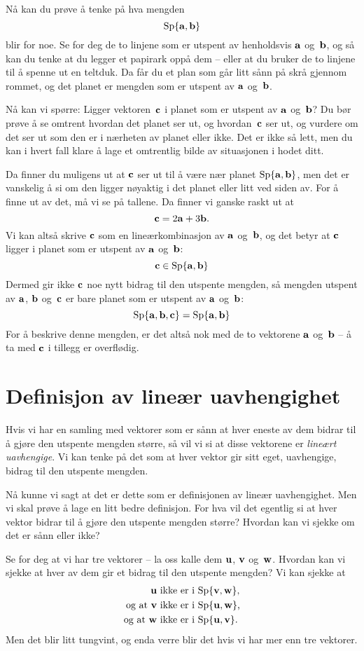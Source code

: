 Nå kan du prøve å tenke på hva mengden
\[
\operatorname{Sp} \{ \mathbf{a}, \mathbf{b} \}
\]
blir for noe.  Se for deg de to linjene som er utspent av henholdsvis
$\mathbf{a}$ og~$\mathbf{b}$, og så kan du tenke at du legger et papirark oppå dem --
eller at du bruker de to linjene til å spenne ut en teltduk.  Da får
du et plan som går litt sånn på skrå gjennom rommet, og det planet er
mengden som er utspent av $\mathbf{a}$ og~$\mathbf{b}$.

Nå kan vi spørre: Ligger vektoren~$\mathbf{c}$ i planet som er utspent av $\mathbf{a}$
og~$\mathbf{b}$?  Du bør prøve å se omtrent hvordan det planet ser ut, og
hvordan~$\mathbf{c}$ ser ut, og vurdere om det ser ut som den er i nærheten av
planet eller ikke.  Det er ikke så lett, men du kan i hvert fall klare
å lage et omtrentlig bilde av situasjonen i hodet ditt.

Da finner du muligens ut at $\mathbf{c}$ ser ut til å være nær planet
$\operatorname{Sp}\{ \mathbf{a}, \mathbf{b} \}$, men det er vanskelig å si om den ligger nøyaktig i
det planet eller litt ved siden av.  For å finne ut av det, må vi se
på tallene.  Da finner vi ganske raskt ut at
\[
\mathbf{c} = 2\mathbf{a} + 3\mathbf{b}.
\]
Vi kan altså skrive $\mathbf{c}$ som en lineærkombinasjon av $\mathbf{a}$ og~$\mathbf{b}$, og
det betyr at $\mathbf{c}$ ligger i planet som er utspent av $\mathbf{a}$ og~$\mathbf{b}$:
\[
\mathbf{c} \in \operatorname{Sp} \{ \mathbf{a}, \mathbf{b} \}
\]
Dermed gir ikke $\mathbf{c}$ noe nytt bidrag til den utspente mengden, så
mengden utspent av $\mathbf{a}$, $\mathbf{b}$ og~$\mathbf{c}$ er bare planet som er utspent av
$\mathbf{a}$ og~$\mathbf{b}$:
\[
\operatorname{Sp} \{ \mathbf{a}, \mathbf{b}, \mathbf{c} \} = \operatorname{Sp} \{ \mathbf{a}, \mathbf{b} \}
\]
For å beskrive denne mengden, er det altså nok med de to vektorene
$\mathbf{a}$ og~$\mathbf{b}$ -- å ta med $\mathbf{c}$ i tillegg er overflødig.


\section*{Definisjon av lineær uavhengighet}

Hvis vi har en samling med vektorer som er sånn at hver eneste av dem
bidrar til å gjøre den utspente mengden større, så vil vi si at disse
vektorene er \emph{lineært uavhengige}.  Vi kan tenke på det som at
hver vektor gir sitt eget, uavhengige, bidrag til den utspente
mengden.

Nå kunne vi sagt at det er dette som er definisjonen av lineær
uavhengighet.  Men vi skal prøve å lage en litt bedre definisjon.  For
hva vil det egentlig si at hver vektor bidrar til å gjøre den utspente
mengden større?  Hvordan kan vi sjekke om det er sånn eller ikke?

Se for deg at vi har tre vektorer -- la oss kalle dem $\mathbf{u}$, $\mathbf{v}$
og~$\mathbf{w}$.  Hvordan kan vi sjekke at hver av dem gir et bidrag til den
utspente mengden?  Vi kan sjekke at
\begin{align*}
  \mathbf{u} &\text{ ikke er i $\operatorname{Sp}\{ \mathbf{v}, \mathbf{w} \}$,} \\
  \text{og at }
  \mathbf{v} &\text{ ikke er i $\operatorname{Sp}\{ \mathbf{u}, \mathbf{w} \}$,} \\
  \text{og at }
  \mathbf{w} &\text{ ikke er i $\operatorname{Sp}\{ \mathbf{u}, \mathbf{v} \}$.}
\end{align*}
Men det blir litt tungvint, og enda verre blir det hvis vi har mer enn
tre vektorer.

